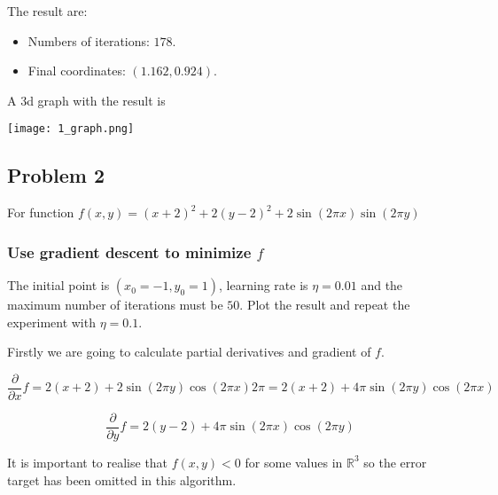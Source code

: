 The result are:

\begin{itemize}
\item Numbers of iterations: $178.$
\item Final coordinates: $( 1.162 ,  0.924 ).$
\end{itemize}

A 3d graph with the result is 

\texttt{[image: 1\_graph.png]}



\subsection{Problem 2}


For function $f(x,y) = (x+2)^2 + 2(y-2)^2 + 2 \sin (2 \pi x) \sin (2 \pi y)$

\subsubsection{ Use gradient descent to minimize $f$}

The initial point is $(x_0 = -1, y_0 = 1)$,
learning rate is $\eta = 0.01$ and the maximum number of iterations must
be $50$.  Plot the result and repeat the experiment with  $\eta = 0.1$. 

Firstly we are going to calculate partial derivatives and gradient of $f$.

\begin{equation*}
  \frac{\partial }{\partial x} f = 2 (x + 2) + 2 \sin (2 \pi y) \cos ( 2 \pi x) 2 \pi =  2 (x + 2) +  4 \pi \sin (2 \pi y) \cos ( 2 \pi x)   
\end{equation*}

\begin{equation*}
  \frac{\partial }{\partial y} f = 2 (y - 2) +  4 \pi \sin (2 \pi x) \cos ( 2 \pi y)   
\end{equation*}


It is important to realise that $f(x,y) <0$ for some values in $\mathbb R^3$ so the error target has been omitted in this algorithm.   



